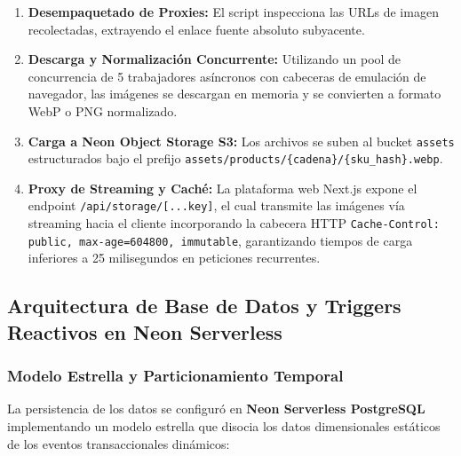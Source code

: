 \begin{enumerate}[leftmargin=*]
    \item \textbf{Desempaquetado de Proxies:} El script inspecciona las URLs de imagen recolectadas, extrayendo el enlace fuente absoluto subyacente.
    \item \textbf{Descarga y Normalización Concurrente:} Utilizando un pool de concurrencia de 5 trabajadores asíncronos con cabeceras de emulación de navegador, las imágenes se descargan en memoria y se convierten a formato WebP o PNG normalizado.
    \item \textbf{Carga a Neon Object Storage S3:} Los archivos se suben al bucket \texttt{assets} estructurados bajo el prefijo \texttt{assets/products/\{cadena\}/\{sku\_hash\}.webp}.
    \item \textbf{Proxy de Streaming y Caché:} La plataforma web Next.js expone el endpoint \texttt{/api/storage/[...key]}, el cual transmite las imágenes vía streaming hacia el cliente incorporando la cabecera HTTP \texttt{Cache-Control: public, max-age=604800, immutable}, garantizando tiempos de carga inferiores a 25 milisegundos en peticiones recurrentes.
\end{enumerate}

\subsection{Arquitectura de Base de Datos y Triggers Reactivos en Neon Serverless}

\subsubsection{Modelo Estrella y Particionamiento Temporal}
La persistencia de los datos se configuró en \textbf{Neon Serverless PostgreSQL} implementando un modelo estrella que disocia los datos dimensionales estáticos de los eventos transaccionales dinámicos:

